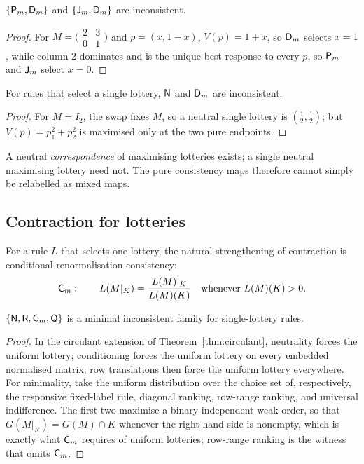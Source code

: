 \begin{proposition}\label{prop:mixedconflict}
$\{\textup{\textsf{P}}_m,\textup{\textsf{D}}_m\}$ and $\{\textup{\textsf{J}}_m,\textup{\textsf{D}}_m\}$ are inconsistent.
\end{proposition}

\begin{proof}
For $M=\bigl(\begin{smallmatrix}2&3\\0&1\end{smallmatrix}\bigr)$ and $p=(x,1-x)$, $V(p)=1+x$, so $\textup{\textsf{D}}_m$ selects
$x=1$, while column $2$ dominates and is the unique best response to every $p$, so $\textup{\textsf{P}}_m$ and
$\textup{\textsf{J}}_m$ select $x=0$.
\end{proof}

\begin{proposition}\label{prop:mixedN}
For rules that select a single lottery, $\textup{\textsf{N}}$ and $\textup{\textsf{D}}_m$ are inconsistent.
\end{proposition}

\begin{proof}
For $M=I_2$, the swap fixes $M$, so a neutral single lottery is $(\tfrac12,\tfrac12)$; but
$V(p)=p_1^2+p_2^2$ is maximised only at the two pure endpoints.
\end{proof}

A neutral \emph{correspondence} of maximising lotteries exists; a single neutral maximising lottery
need not. The pure consistency maps therefore cannot simply be relabelled as mixed maps.

\subsection{Contraction for lotteries}

For a rule $L$ that selects one lottery, the natural strengthening of contraction is
conditional-renormalisation consistency:
\[
  \textup{\textsf{C}}_m:\qquad L(M|_K)=\frac{L(M)|_K}{L(M)(K)}\quad\text{whenever }L(M)(K)>0 .
\]

\begin{proposition}\label{prop:mixedcirculant}
$\{\textup{\textsf{N}},\textup{\textsf{R}},\textup{\textsf{C}}_m,\textup{\textsf{Q}}\}$ is a minimal inconsistent family for single-lottery rules.
\end{proposition}

\begin{proof}
In the circulant extension of Theorem~\ref{thm:circulant}, neutrality forces the uniform lottery;
conditioning forces the uniform lottery on every embedded normalised matrix; row translations then
force the uniform lottery everywhere. For minimality, take the uniform distribution over the
choice set of, respectively, the responsive fixed-label rule, diagonal ranking, row-range ranking,
and universal indifference. The first two maximise a binary-independent weak order, so that
$G(M|_K)=G(M)\cap K$ whenever the right-hand side is nonempty, which is exactly what $\textup{\textsf{C}}_m$ requires of
uniform lotteries; row-range ranking is the witness that omits $\textup{\textsf{C}}_m$.
\end{proof}

